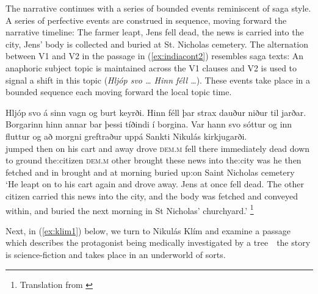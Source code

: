 \documentclass[output=paper,colorlinks,citecolor=brown]{langscibook}
\begin{document}
The narrative continues with a series of bounded events reminiscent of saga style. A series of perfective events are construed in sequence, moving forward the narrative timeline: The farmer leapt, Jens fell dead, the news is carried into the city, Jens' body is collected and buried at St. Nicholas cemetery. The alternation between V1 and V2 in the passage in (\ref{ex:indiacont2}) resembles saga texts: An anaphoric subject topic is maintained across the V1 clauses and V2 is used to signal a shift in this topic (\textit{Hljóp svo \dots {} Hinn féll \dots}). These events take place in a bounded sequence each moving forward the local topic time.

\ea\label{ex:indiacont2}
\gll Hljóp svo á sinn vagn og burt keyrði.  Hinn féll þar strax dauður niður til jarðar.  Borgarinn hinn annar bar þessi tíðindi í borgina. Var hann svo sóttur og inn fluttur og að morgni greftraður uppá Sankti Nikulás kirkjugarði.\\
jumped then on his cart and away drove \textsc{dem.m} fell there immediately dead down to ground the:citizen \textsc{dem.m} other brought these news into the:city was he then fetched and in brought and at morning buried up:on Saint Nicholas cemetery\\
\glt `He leapt on to his cart again and drove away. Jens at once fell dead. The other citizen carried this news into the city, and the body was fetched and conveyed within, and buried the next morning in St Nicholas' churchyard.' \hfill \citep[39]{olafsson1908aefisaga}\footnote{Translation from \citet[96]{phillpotts2017life}}
\z

Next, in (\ref{ex:klim1}) below, we turn to Nikulás Klím and examine a passage which describes the protagonist being medically investigated by a tree\ \textendash{}\  the story is science-fiction and takes place in an underworld of sorts. 
\end{document}
